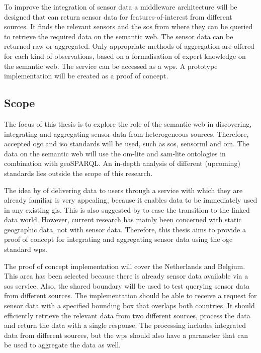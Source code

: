 To improve the integration of sensor data a middleware architecture will be designed that can return sensor data for features-of-interest from different sources. It finds the relevant sensors and the \ac{sos} from where they can be queried to retrieve the required data on the semantic web. The sensor data can be returned raw or aggregated. Only appropriate methods of aggregation are offered for each kind of observations, based on a formalisation of expert knowledge on the semantic web. The service can be accessed as a \ac{wps}. A prototype implementation will be created as a proof of concept.

\subsection{Scope}
The focus of this thesis is to explore the role of the semantic web in discovering, integrating and aggregating sensor data from heterogeneous sources. Therefore, accepted \ac{ogc} and \ac{iso} standards will be used, such as \ac{sos}, \ac{sensorml} and \ac{om}. The data on the semantic web will use the om-lite and sam-lite ontologies in combination with geoSPARQL. An in-depth analysis of different (upcoming) standards lies outside the scope of this research. 

The idea by \cite{SW:Jones} of delivering data to users through a service with which they are already familiar is very appealing, because it enables data to be immediately used in any existing \ac{gis}. This is also suggested by \cite{SSW:Atkinson} to ease the transition to the linked data world. However, current research has mainly been concerned with static geographic data, not with sensor data. Therefore, this thesis aims to provide a proof of concept for integrating and aggregating sensor data using the \ac{ogc} standard \ac{wps}.

The proof of concept implementation will cover the Netherlands and Belgium. This area has been selected because there is already sensor data available via a \ac{sos} service. Also, the shared boundary will be used to test querying sensor data from different sources. The implementation should be able to receive a request for sensor data with a specified bounding box that overlaps both countries. It should efficiently retrieve the relevant data from two different sources, process the data and return the data with a single response. The processing includes integrated data from different sources, but the \ac{wps} should also have a parameter that can be used to aggregate the data as well.     





